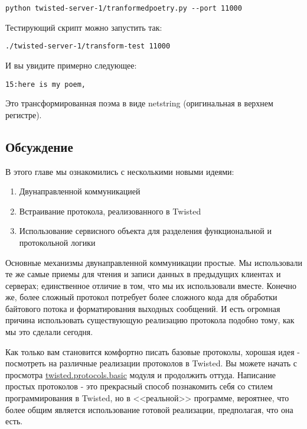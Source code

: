  \begin{verbatim}
python twisted-server-1/tranformedpoetry.py --port 11000
\end{verbatim} 

Тестирующий скрипт можно запустить так:

 \begin{verbatim}
./twisted-server-1/transform-test 11000
\end{verbatim} 

И вы увидите примерно следующее:

 \begin{verbatim}
15:here is my poem,
\end{verbatim} 

Это трансформированная поэма в виде netstring (оригинальная в верхнем регистре).


\subsection{Обсуждение}


В этого главе мы ознакомились с несколькими новыми идеями:

\begin{enumerate}
\item Двунаправленной коммуникацией
\item Встраивание протокола, реализованного в Twisted
\item Использование сервисного объекта для разделения функциональной и 
протокольной логики
\end{enumerate} 


Основные механизмы двунаправленной коммуникации простые. 
Мы использовали те же самые приемы для чтения и 
записи данных в предыдущих клиентах и серверах; 
единственное отличие в том, что мы их использовали вместе. 
Конечно же, более сложный протокол потребует более 
сложного кода для обработки байтового потока и 
форматирования выходных сообщений. И есть огромная причина 
использовать существующую реализацию протокола подобно тому, 
как мы это сделали сегодня.


Как только вам становится комфортно писать базовые протоколы, 
хорошая идея - посмотреть на различные реализации протоколов в Twisted. 
Вы можете начать с просмотра 
\href{http://twistedmatrix.com/trac/browser/tags/releases/twisted-8.2.0/twisted/protocols/basic.py}{twisted.protocols.basic} модуля и продолжить оттуда. Написание 
простых протоколов - это прекрасный способ познакомить 
себя со стилем программирования в Twisted, но в 
<<реальной>> программе, вероятнее, что более общим 
является использование готовой реализации, предполагая, что 
она есть.
 

